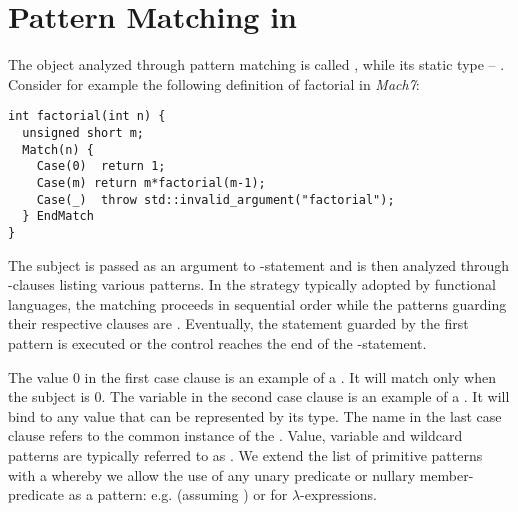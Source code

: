 \section{Pattern Matching in \Cpp{}} %
\label{sec:cpppat}



The object analyzed through pattern matching is called , while its 
static type -- .
Consider for example the following definition of factorial in \emph{Mach7}:

\begin{lstlisting}[keepspaces]
int factorial(int n) {
  unsigned short m;
  Match(n) {
    Case(0)  return 1;
    Case(m) return m*factorial(m-1);
    Case(_)  throw std::invalid_argument("factorial");
  } EndMatch
}
\end{lstlisting}

\noindent
The subject  is passed as an argument to -statement and is 
then analyzed through -clauses listing various patterns. In the 
 strategy typically adopted by functional languages, the 
matching proceeds in sequential order while the patterns guarding their 
respective clauses are . Eventually, the statement guarded by the 
first  pattern is executed or the control reaches the end of 
the -statement.

The value 0 in the first case clause is an example of a . It 
will match only when the subject  is 0. The variable  in the 
second case clause is an example of a . It will bind to 
any value that can be represented by its type. The name \code{_} in the last 
case clause refers to the common instance of the . Value, 
variable and wildcard patterns are typically referred to as . We extend the list of primitive patterns with a  whereby we allow the use of any unary predicate or nullary 
member-predicate as a pattern: e.g.  (assuming 
) or  for $\lambda$-expressions.


